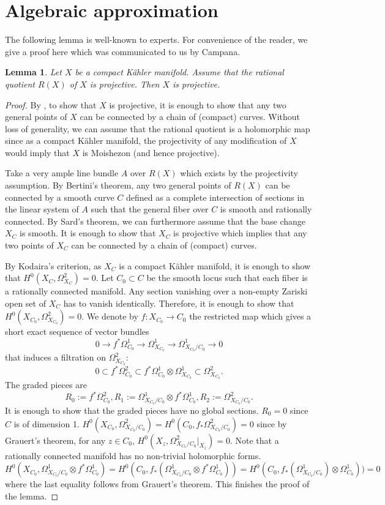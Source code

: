 \documentclass[a4, 12pt]{amsart}
\newtheorem{lem}[thm]{Lemma}
\numberwithin{equation}{section}
\theoremstyle{definition}
\begin{document}
\section{Algebraic approximation}

The following lemma is well-known to experts. 
For convenience of the reader, we give a proof here which was communicated to us by Campana.
\begin{lem}\label{Lem8}
Let $X$ be a compact K\"ahler manifold.
Assume that the rational quotient $R(X)$ of $X$ is projective.
Then $X$ is projective.
\end{lem}
\begin{proof}
By \cite{Cam81}, to show that $X$ is projective, it is enough to show that any two general points of $X$ can be connected by a chain of (compact) curves.
Without loss of generality, we can assume that the rational quotient is a holomorphic map since as a compact K\"ahler manifold, the projectivity of any modification of $X$ would imply that $X$ is Moishezon (and hence projective).

Take a very ample line bundle $A$ over $R(X)$ which exists by the projectivity assumption.
By Bertini's theorem, any two general points of $R(X)$ can be connected by a smooth curve $C$ defined as a complete intersection of sections in the linear system of $A$ such that the general fiber over $C$ is smooth and rationally connected.
By Sard's theorem, we can furthermore assume that the base change $X_C$ is smooth.
It is enough to show that $X_C$ is projective which implies that any two points of $X_C$ can be connected by a chain of (compact) curves.

By Kodaira's criterion, as $X_C$ is a compact K\"ahler manifold, it is enough to show that $H^0(X_C, \Omega_{X_C}^2)=0$.
Let $C_0 \subset C$ be the smooth locus such that each fiber is a rationally connected manifold.
Any section vanishing over a non-empty Zariski open set of $X_C$ has to vanish identically.
Therefore, it is enough to show that $H^0(X_{C_0}, \Omega_{X_{C_0}}^2)=0$.
We denote by $f: X_{C_0} \to C_0$ the restricted map which gives a short exact sequence of vector bundles
$$0 \to f^* \Omega^1_{C_0} \to \Omega^1_{X_{C_0}} \to \Omega^1_{X_{C_0}/C_0} \to 0$$
that induces a filtration on $\Omega^2_{X_{C_0}}:$
$$0 \subset f^*\Omega^2_{{C_0}} \subset f^*\Omega^1_{{C_0}} \otimes \Omega^1_{X_{C_0}} \subset \Omega^2_{X_{C_0}}.$$
The graded pieces are
$$R_0:=f^*\Omega^2_{{C_0}},R_1:= \Omega^1_{X_{C_0}/C_0} \otimes f^* \Omega^1_{{C_0}}, R_2:=\Omega^2_{X_{C_0}/C_0}.$$
It is enough to show that the graded pieces have no global sections.
$R_0=0$ since $C$ is of dimension 1.
$H^0(X_{C_0}, \Omega^2_{X_{C_0}/C_0})=H^0(C_0, f_* \Omega^2_{X_{C_0}/C_0})=0$ since by Grauert's theorem, for any $z \in C_0$,
$H^0(X_z, \Omega^2_{X_{C_0}/C_0}|_{X_z})=0$.
Note that a rationally connected manifold has no non-trivial holomorphic forms.
$H^0(X_{C_0}, \Omega^1_{X_{C_0}/C_0} \otimes f^* \Omega^1_{{C_0}})=H^0(C_0, f_*(\Omega^1_{X_{C_0}/C_0} \otimes f^* \Omega^1_{{C_0}}))=H^0(C_0, f_*(\Omega^1_{X_{C_0}/C_0}) \otimes \Omega^1_{{C_0}}))=0$
 where the last equality follows from Grauert's theorem.
This finishes the proof of the lemma.
\end{proof}
\end{document}
